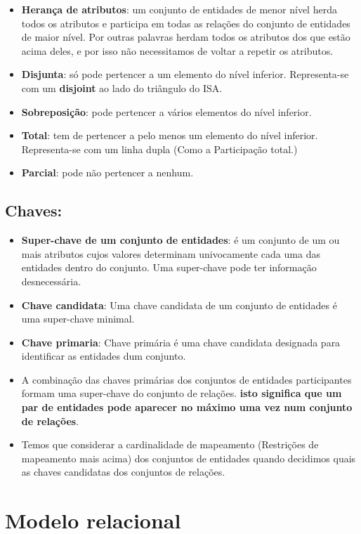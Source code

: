 \documentclass{article}
\begin{document}
\begin{itemize}
  \item \textbf{Herança de atributos}: um conjunto de entidades de menor nível herda todos os atributos e participa em todas as relações do conjunto de entidades de maior nível. Por outras palavras herdam todos os atributos dos que estão acima deles, e por isso não necessitamos de voltar a repetir os atributos.
  \item \textbf{Disjunta}: só pode pertencer a um elemento do nível inferior. Representa-se com um \textbf{disjoint} ao lado do triângulo do ISA.
  \item \textbf{Sobreposição}: pode pertencer a vários elementos do nível inferior.
  \item \textbf{Total}: tem de pertencer a pelo menos um elemento do nível inferior. Representa-se com um linha dupla (Como a Participação total.)
  \item \textbf{Parcial}: pode não pertencer a nenhum.
\end{itemize}

\subsection*{Chaves:}
\begin{itemize}
  \item \textbf{Super-chave de um conjunto de entidades}: é um conjunto de um ou mais atributos cujos valores determinam univocamente cada uma das entidades dentro do conjunto. Uma super-chave pode ter informação desnecessária.
  \item \textbf{Chave candidata}: Uma chave candidata de um conjunto de entidades é uma super-chave minimal.
  \item \textbf{Chave primaria}: Chave primária é uma chave candidata designada para identificar as entidades dum conjunto.
  \item A combinação das chaves primárias dos conjuntos de entidades participantes formam uma super-chave do conjunto de relações. \textbf{isto significa que um par de entidades pode aparecer no máximo uma vez num conjunto de relações}.
  \item Temos que considerar a cardinalidade de mapeamento (Restrições de mapeamento mais acima) dos conjuntos de entidades quando decidimos quais as chaves candidatas dos conjuntos de relações.
\end{itemize}

\section{Modelo relacional}
\end{document}
